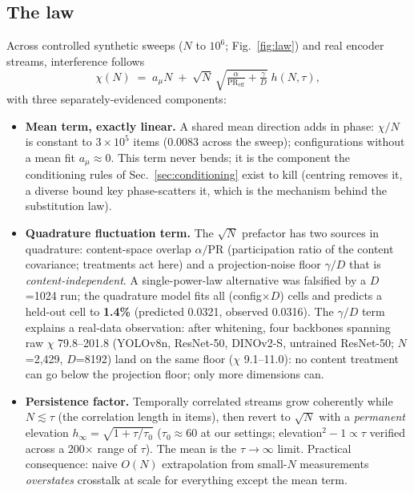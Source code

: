 \documentclass[conference]{IEEEtran}
\begin{document}
\subsection{The law}
Across controlled synthetic sweeps ($N$ to $10^6$;
Fig.~\ref{fig:law}) and real encoder streams, interference follows
\begin{equation}
\chi(N) \;=\; a_\mu N \;+\; \sqrt{N}\,
\sqrt{\tfrac{\alpha}{\mathrm{PR}_{\mathrm{eff}}} + \tfrac{\gamma}{D}}\;
h(N,\tau),
\label{eq:law}
\end{equation}
with three separately-evidenced components:
\begin{itemize}
\item \textbf{Mean term, exactly linear.} A shared mean direction adds in
  phase: $\chi/N$ is constant to $3\times10^{5}$ items (0.0083 across the
  sweep); configurations without a mean fit $a_\mu \approx 0$. This term
  never bends; it is the component the conditioning rules of
  Sec.~\ref{sec:conditioning} exist to kill (centring removes it,
  a diverse bound key phase-scatters it, which is the mechanism behind
  the substitution law).
\item \textbf{Quadrature fluctuation term.} The $\sqrt{N}$ prefactor has
  two sources in quadrature: content-space overlap $\alpha/\mathrm{PR}$
  (participation ratio of the content covariance; treatments act here)
  and a projection-noise floor $\gamma/D$ that is
  \emph{content-independent}. A single-power-law alternative was
  falsified by a $D$=1024 run; the quadrature model fits all
  (config$\times D$) cells and predicts a held-out cell to
  \textbf{1.4\%} (predicted 0.0321, observed 0.0316). The $\gamma/D$
  term explains a real-data observation: after whitening, four backbones
  spanning raw $\chi$ 79.8--201.8 (YOLOv8n, ResNet-50, DINOv2-S,
  untrained ResNet-50; $N$=2{,}429, $D$=8192) land on the same floor
  ($\chi$ 9.1--11.0): no content treatment can go below the
  projection floor; only more dimensions can.
\item \textbf{Persistence factor.} Temporally correlated streams grow
  coherently while $N \lesssim \tau$ (the correlation length in items),
  then revert to $\sqrt{N}$ with a \emph{permanent} elevation
  $h_\infty = \sqrt{1 + \tau/\tau_0}$ ($\tau_0 \approx 60$ at our
  settings; elevation$^2-1 \propto \tau$ verified across a 200$\times$
  range of $\tau$). The mean is the $\tau\to\infty$ limit. Practical
  consequence: naive $O(N)$ extrapolation from small-$N$ measurements
  \emph{overstates} crosstalk at scale for everything except the mean
  term.
\end{itemize}
\end{document}
